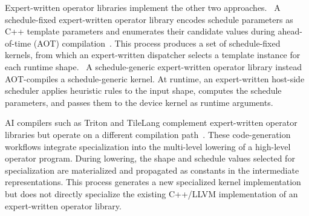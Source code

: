 {\color{red}%
\mbox{\cite{nvidia2017cutlass,ye2025flashinfer,dao2024flashattention2}}\hspace{0pt}\mbox{\cite{liao2019davinci}}\hspace{0pt}\mbox{\cite{ascend_cannopsadv}}\hspace{0pt}
\par}
{\color{blue}%
Expert-written operator libraries implement the other two approaches. ~A schedule-fixed expert-written operator library encodes schedule parameters as C++ template parameters and enumerates their candidate values during ahead-of-time (AOT) compilation~\cite{nvidia2017cutlass,ye2025flashinfer,dao2024flashattention2}. This process produces a set of schedule-fixed kernels, from which an expert-written dispatcher selects a template instance for each runtime shape. ~A schedule-generic expert-written operator library instead AOT-compiles a schedule-generic kernel. At runtime, an expert-written host-side scheduler applies heuristic rules to the input shape, computes the schedule parameters, and passes them to the device kernel as runtime arguments.
\par}

{\color{red}%
\par}
{\color{blue}%
AI compilers such as Triton and TileLang complement expert-written operator libraries but operate on a different compilation path~\cite{tillet2019triton,tilelang}. These code-generation workflows integrate specialization into the multi-level lowering of a high-level operator program. During lowering, the shape and schedule values selected for specialization are materialized and propagated as constants in the intermediate representations. This process generates a new specialized kernel implementation but does not directly specialize the existing C++/LLVM implementation of an expert-written operator library.
\par}


